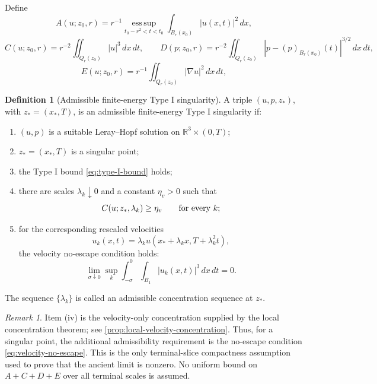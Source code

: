 \documentclass[11pt]{amsart}
\theoremstyle{plain}
\theoremstyle{definition}
\newtheorem{definition}[theorem]{Definition}
\theoremstyle{remark}
\newtheorem{remark}[theorem]{Remark}
\numberwithin{equation}{section}
\newcommand{\R}{\mathbb R}
\newcommand{\esssup}{\operatorname*{ess\,sup}}
\begin{document}
Define
\begin{equation}\label{eq:C-D-def}
   A(u;z_0,r)=r^{-1}\esssup_{t_0-r^2<t<t_0}
   \int_{B_r(x_0)}|u(x,t)|^2\,dx,
\end{equation}
\begin{equation}\label{eq:C-D-def-2}
   C(u;z_0,r)=r^{-2}\iint_{Q_r(z_0)}|u|^3\,dx\,dt,
   \qquad
   D(p;z_0,r)=r^{-2}\iint_{Q_r(z_0)}
   |p-(p)_{B_r(x_0)}(t)|^{3/2}\,dx\,dt,
\end{equation}
\begin{equation}\label{eq:E-I-def}
   E(u;z_0,r)=r^{-1}\iint_{Q_r(z_0)}|\nabla u|^2\,dx\,dt,
\end{equation}
\begin{definition}[Admissible finite-energy Type I singularity]
\label{def:admissible-type-I}
A triple \((u,p,z_*)\), with \(z_*=(x_*,T)\), is an admissible finite-energy
Type I singularity if:
\begin{enumerate}[label=(\roman*)]
\item \((u,p)\) is a suitable Leray--Hopf solution on
\(\R^3\times(0,T)\);
\item \(z_*=(x_*,T)\) is a singular point;
\item the Type I bound \eqref{eq:type-I-bound} holds;
\item there are scales \(\lambda_k\downarrow0\) and a constant
\(\eta_v>0\) such that
\[
   C(u;z_*,\lambda_k)\ge\eta_v
   \qquad\hbox{for every }k;
\]
\item for the corresponding rescaled velocities
\[
   u_k(x,t)=\lambda_k u(x_*+\lambda_kx,T+\lambda_k^2t),
\]
the velocity no-escape condition holds:
\begin{equation}\label{eq:velocity-no-escape}
   \lim_{\sigma\downarrow0}
   \sup_k
   \int_{-\sigma}^{0}\int_{B_1}|u_k(x,t)|^3\,dx\,dt=0 .
\end{equation}
\end{enumerate}
The sequence \(\{\lambda_k\}\) is called an admissible concentration sequence
at \(z_*\).
\end{definition}

\begin{remark}
Item (iv) is the velocity-only concentration supplied by the local
concentration theorem; see \cref{prop:local-velocity-concentration}.  Thus,
for a singular point, the additional admissibility requirement is the
no-escape condition \eqref{eq:velocity-no-escape}.  This is the only
terminal-slice compactness assumption used to prove that the ancient limit is
nonzero.  No uniform bound on \(A+C+D+E\) over all terminal scales is assumed.
\end{remark}
\end{document}
